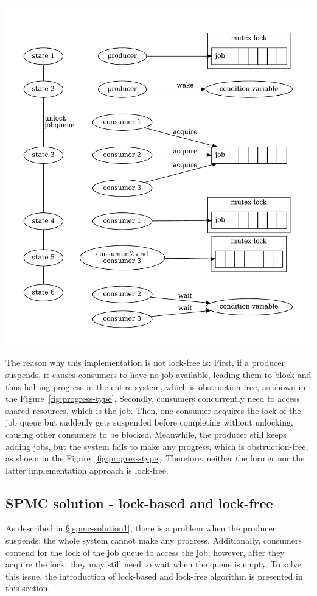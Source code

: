 \documentclass[fontsize=10pt, oneside]{scrartcl}
\newcommand{\fig}[1]{Figure~\ref{#1}}
\newcommand{\secref}[1]{\hyperref[#1]{\textsc{\S}\ref*{#1}}}
\begin{document}
\includegraphics[keepaspectratio, width=0.6\linewidth]{images/spmc-solution1}
\label{fig:spmc-solution1}

The reason why this implementation is not lock-free is: 
First, if a producer suspends, 
it causes consumers to have no job available, 
leading them to block and thus halting progress in the entire system, 
which is obstruction-free, as shown in the \fig{fig:progress-type}.
Secondly, consumers concurrently need to access shared resources, which is the job.
Then, one consumer acquires the lock of the job queue but suddenly gets suspended before completing without unlocking, 
causing other consumers to be blocked.
Meanwhile, the producer still keeps adding jobs, but the system fails to make any progress,
which is obstruction-free, as shown in the \fig{fig:progress-type}.
Therefore, neither the former nor the latter implementation approach is lock-free.

\subsection{SPMC solution - lock-based and lock-free}
\label{spmc-solution2}
As described in \secref{spmc-solution1}, there is a problem when the producer suspends; 
the whole system cannot make any progress.
Additionally, consumers contend for the lock of the job queue to access the job; 
however, after they acquire the lock, they may still need to wait when the queue is empty. 
To solve this issue, the introduction of lock-based and lock-free algorithm is presented in this section.
\end{document}
